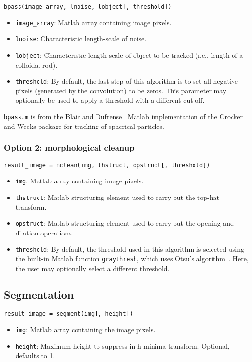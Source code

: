 \texttt{bpass(image\_array, lnoise, lobject[, threshold])}

\begin{itemize}
\item \texttt{image\_array}: Matlab array containing image pixels.
\item \texttt{lnoise}: Characteristic length-scale of noise.
\item \texttt{lobject}: Characteristic length-scale of object to be tracked (i.e., length of a colloidal rod).
\item \texttt{threshold}: By default, the last step of this algorithm is to set all negative pixels (generated
by the convolution) to be zeros. This parameter may optionally be used to apply a threshold with a different cut-off.
\end{itemize}

\texttt{bpass.m} is from the Blair and Dufrense~\cite{blair-matlab} Matlab implementation of the Crocker and Weeks
package for tracking of spherical particles.~\cite{crocker-tracking}

\subsubsection{Option 2: morphological cleanup}

\texttt{result\_image = mclean(img, thstruct, opstruct[, threshold])}

\begin{itemize}
\item \texttt{img}: Matlab array containing image pixels.
\item \texttt{thstruct}: Matlab structuring element used to carry out the top-hat transform.
\item \texttt{opstruct}: Matlab structuring element used to carry out the opening and dilation operations.
\item \texttt{threshold}: By default, the threshold used in this algorithm is selected using the built-in
Matlab function \texttt{graythresh}, which uses Otsu's algorithm~\cite{?}. Here, the user may optionally
select a different threshold.
\end{itemize}

\subsection{Segmentation}

\texttt{result\_image = segment(img[, height])}

\begin{itemize}
\item \texttt{img}: Matlab array containing the image pixels.
\item \texttt{height}: Maximum height to suppress in h-minima transform. Optional, defaults to 1.
\end{itemize}

